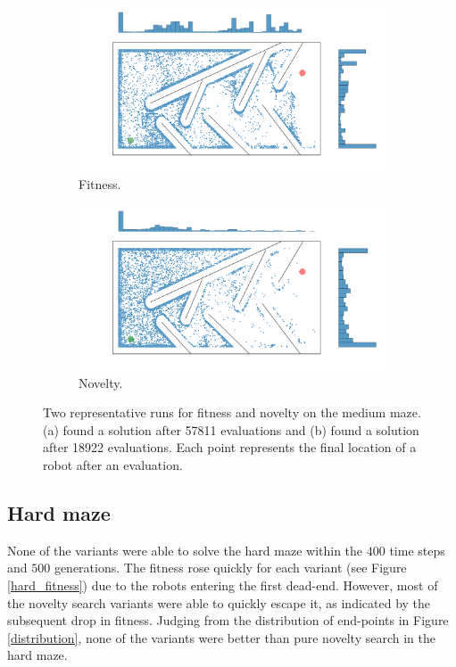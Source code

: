 \begin{figure}[H]
    \begin{mdframed}
        \begin{subfigure}[b]{0.45\textwidth}
            \includegraphics[scale=0.1]{resources/mazes/fitness_medium.png}
            \caption{Fitness.}
            \label{fitness_only}
        \end{subfigure}
        \begin{subfigure}[b]{0.5\textwidth}
            \includegraphics[scale=0.1]{resources/mazes/novelty_medium.png}
            \caption{Novelty.}
            \label{novelty_only}
        \end{subfigure}
    \end{mdframed}
    \caption{Two representative runs for fitness and novelty on the medium maze. (a) found a solution after 57811 evaluations
    and (b) found a solution after 18922 evaluations. Each point represents the final location
    of a robot after an evaluation.}
    \label{typical_runs}
\end{figure}

\subsection{Hard maze}
None of the variants were able to solve the hard maze within the $400$ time steps and $500$ generations.
The fitness rose quickly for each variant (see Figure \ref{hard_fitness}) due to the
robots entering the first dead-end. However, most of the novelty search variants
were able to quickly escape it, as indicated by the subsequent drop in fitness.
Judging from the distribution of end-points in Figure \ref{distribution}, none of the variants
were better than pure novelty search in the hard maze.

